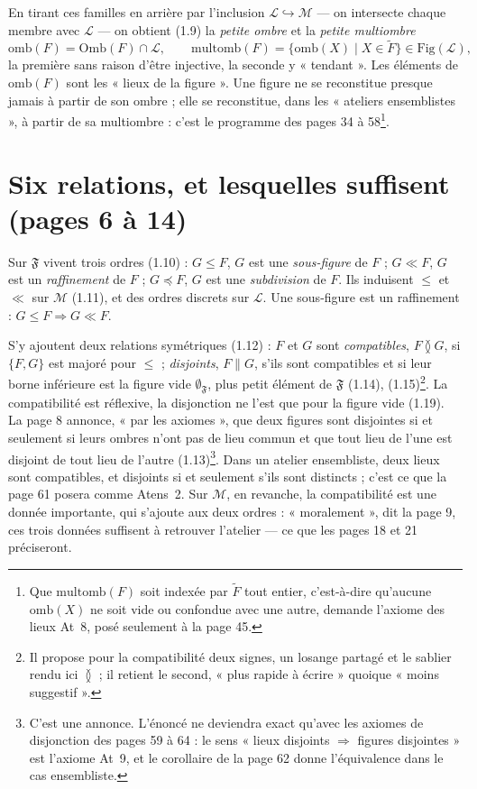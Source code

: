 \documentclass[11pt,a4paper]{article}
\begin{document}
En tirant ces familles en arrière par l'inclusion $\mathcal{L} \hookrightarrow
\mathcal{M}$ --- on intersecte chaque membre avec $\mathcal{L}$ --- on obtient
(1.9) la \emph{petite ombre} et la \emph{petite multiombre}
\[
\mathrm{omb}(F) = \mathrm{Omb}(F) \cap \mathcal{L} , \qquad \mathrm{multomb}(F) =
\lbrace \mathrm{omb}(X) \mid X \in \widetilde{F} \rbrace \in
\mathrm{Fig}(\mathcal{L}) ,
\]
la première sans raison d'être injective, la seconde y « tendant ». Les éléments
de $\mathrm{omb}(F)$ sont les « lieux de la figure ». Une figure ne se
reconstitue presque jamais à partir de son ombre ; elle se reconstitue, dans les
« ateliers ensemblistes », à partir de sa multiombre : c'est le programme des
pages 34 à 58\footnote{Que $\mathrm{multomb}(F)$ soit indexée par $\widetilde{F}$
tout entier, c'est-à-dire qu'aucune $\mathrm{omb}(X)$ ne soit vide ou
confondue avec une autre, demande l'axiome des lieux At~8, posé seulement à la
page 45.}.

\section*{Six relations, et lesquelles suffisent (pages 6 à 14)}

Sur $\mathfrak{F}$ vivent trois ordres (1.10) : $G \leq F$, $G$ est une
\emph{sous-figure} de $F$ ; $G \ll F$, $G$ est un \emph{raffinement} de $F$ ;
$G \preccurlyeq F$, $G$ est une \emph{subdivision} de $F$. Ils induisent $\leq$ et
$\ll$ sur $\mathcal{M}$ (1.11), et des ordres discrets sur $\mathcal{L}$. Une
sous-figure est un raffinement : $G \leq F \Rightarrow G \ll F$.

S'y ajoutent deux relations symétriques (1.12) : $F$ et $G$ sont
\emph{compatibles}, $F \between G$, si $\lbrace F, G \rbrace$ est majoré pour
$\leq$ ; \emph{disjoints}, $F \parallel G$, s'ils sont compatibles et si leur
borne inférieure est la figure vide $\emptyset_{\mathfrak{F}}$, plus petit élément
de $\mathfrak{F}$ (1.14), (1.15)\footnote{Il propose pour la compatibilité deux
signes, un losange partagé et le sablier rendu ici $\between$ ; il retient le
second, « plus rapide à écrire » quoique « moins suggestif ».}. La compatibilité
est réflexive, la disjonction ne l'est que pour la figure vide (1.19). La page 8
annonce, « par les axiomes », que deux figures sont disjointes si et seulement
si leurs ombres n'ont pas de lieu commun et que tout lieu de l'une est disjoint
de tout lieu de l'autre (1.13)\footnote{C'est une annonce. L'énoncé ne
deviendra exact qu'avec les axiomes de disjonction des pages 59 à 64 : le sens
« lieux disjoints $\Rightarrow$ figures disjointes » est l'axiome At~9, et le
corollaire de la page 62 donne l'équivalence dans le cas ensembliste.}. Dans un
atelier ensembliste, deux lieux sont compatibles, et disjoints si et seulement
s'ils sont distincts ; c'est ce que la page 61 posera comme Atens~2. Sur
$\mathcal{M}$, en revanche, la compatibilité est une donnée importante, qui
s'ajoute aux deux ordres : « moralement », dit la page 9, ces trois données
suffisent à retrouver l'atelier --- ce que les pages 18 et 21 préciseront.
\end{document}
